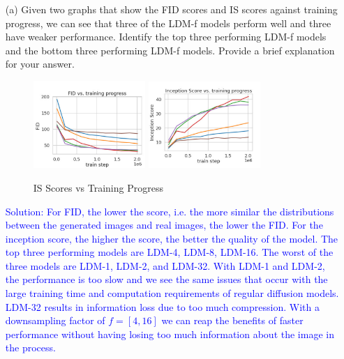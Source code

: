 \documentclass[a4paper]{article}
\begin{document}
\begin{itemize}
    \item [(a)]
    Given two graphs that show the FID scores and IS scores against training progress, we can see that three of the LDM-f models perform well and three have weaker performance. Identify the top three performing LDM-f models and the bottom three performing LDM-f models. Provide a brief explanation for your answer.

     \begin{figure}[htbp]
        \centering
        \includegraphics[width=0.4\textwidth]{fid_scores.png} \hfill
        \includegraphics[width=0.4\textwidth]{is_scores.png}
        \caption{IS Scores vs Training Progress}
        \label{fig:is}
    \end{figure}

     \textcolor{blue}{Solution: For FID, the lower the score, i.e. the more similar the distributions between the generated images and real images, the lower the FID. For the inception score, the higher the score, the better the quality of the model. The top three performing models are LDM-4, LDM-8, LDM-16. The worst of the three models are LDM-1, LDM-2, and LDM-32. With LDM-1 and LDM-2, the performance is too slow and we see the same issues that occur with the large training time and computation requirements of regular diffusion models. LDM-32 results in information loss due to too much compression. With a downsampling factor of \(f = [4, 16]\) we can reap the benefits of faster performance without having losing too much information about the image in the process.}
     
     
\end{itemize}
\end{document}

